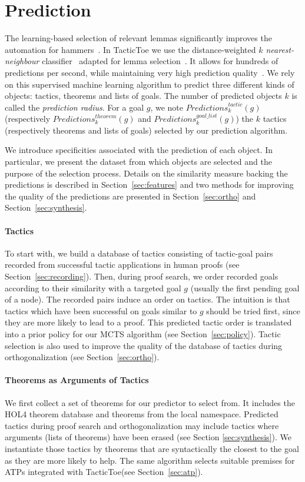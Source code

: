 \documentclass[runningheads,a4paper,draft]{svjour3}
\def\holfour{\textsf{HOL4}\xspace}
\def\tactictoe{\textsf{TacticToe}\xspace}
\begin{document}
\section{Prediction}\label{s:prediction}
The learning-based selection of relevant lemmas significantly improves the
automation for hammers~\cite{BlanchetteGKKU16}. In \tactictoe we use the
distance-weighted \emph{$k$ nearest-neighbour} classifier~\cite{DudaniS76}
adapted for lemma selection~\cite{ckju-pxtp13}. It allows for hundreds of
predictions per second, while maintaining very high prediction quality~\cite{femalecop}.
We rely on this supervised machine learning algorithm to predict three
different kinds of objects:
 tactics, theorems and lists of goals. The number of predicted objects $k$ is
 called the \emph{prediction radius}. For a goal $g$, we note
$\mathit{Predictions}^{\mathit{tactic}}_k (g)$ (respectively
$\mathit{Predictions}^{\mathit{theorem}}_k (g)$
and $\mathit{Predictions}^{\mathit{goal\_list}}_k (g)$) the $k$ tactics
(respectively theorems and lists of goals) selected by our prediction algorithm.

We introduce specificities associated with the prediction of each object.
In particular, we present the dataset from which objects are selected and the
purpose of the selection process. Details on the similarity measure backing the
predictions is described in Section~\ref{sec:features} and two methods for
improving the quality of the predictions are presented in
Section~\ref{sec:ortho} and Section~\ref{sec:synthesis}.

\paragraph{Tactics}
To start with, we build a database of tactics consisting
of tactic-goal pairs recorded from successful tactic applications in human
proofs (see
Section~\ref{sec:recording}).
Then, during proof search, we order recorded goals according to their
similarity with a targeted goal $g$ (usually the first pending goal of a node).
The recorded pairs induce an
order on tactics. The intuition is that tactics which have been successful on
goals similar to $g$ should be tried first, since they are more likely to lead
to a proof.
This predicted tactic order is translated into a prior policy for our MCTS
algorithm (see Section~\ref{sec:policy}).
Tactic selection is also used to improve the quality of the database
of tactics during orthogonalization (see Section~\ref{sec:ortho}).

\paragraph{Theorems as Arguments of Tactics}
We first collect a set of theorems for our predictor to select from.
It includes the \holfour theorem database and theorems from the local namespace.
Predicted tactics during proof search and orthogonalization may include
tactics where arguments (lists of theorems) have been erased (see Section
\ref{sec:synthesis}).
We instantiate those tactics by theorems that are syntactically the closest to
the goal as they are more likely to help.
The same algorithm selects suitable premises for ATPs integrated with
\tactictoe (see Section~\ref{sec:atp}).
\end{document}
